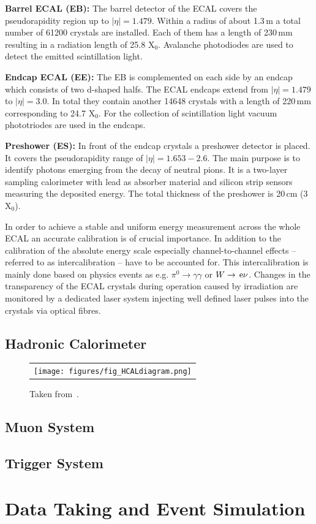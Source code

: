\begin{description}
 \item \textbf{Barrel ECAL (EB):} The barrel detector of the ECAL covers the pseudorapidity region up to $|\eta| = 1.479$. Within a radius of about 1.3\,m a total number of 61200 crystals are installed. Each of them has a length of 230\,mm resulting in a radiation length of 25.8 $\mathrm{X_0}$. Avalanche photodiodes are used to detect the emitted scintillation light.
 \item \textbf{Endcap ECAL (EE):} The EB is complemented on each side by an endcap which consists of two d-shaped halfs. The ECAL endcaps extend from $|\eta| = 1.479$ to $|\eta| = 3.0$. In total they contain another 14648 crystals with a length of 220\,mm corresponding to 24.7 $\mathrm{X}_0$. For the collection of scintillation light vacuum phototriodes are used in the endcaps.
 \item \textbf{Preshower (ES):} In front of the endcap crystals a preshower detector is placed. It covers the pseudorapidity range of $|\eta| = 1.653 - 2.6$. The main purpose is to identify photons emerging from the decay of neutral pions. It is a two-layer sampling calorimeter with lead as absorber material and silicon strip sensors measuring the deposited energy. The total thickness of the preshower is 20\,cm (3 $\mathrm{X_0}$).
\end{description}
In order to achieve a stable and uniform energy measurement across the whole ECAL an accurate calibration is of crucial importance. In addition to the calibration of the absolute energy scale especially channel-to-channel effects -- referred to as intercalibration -- have to be accounted for. This intercalibration is mainly done based on physics events as e.g. $\pi^0 \rightarrow \gamma \gamma$ or $W \rightarrow \,\text{e} \nu$. Changes in the transparency of the ECAL crystals during operation caused by irradiation are monitored by a dedicated laser system injecting well defined laser pulses into the crystals via optical fibres. 

\subsection{Hadronic Calorimeter}
\label{subsec:cms_hcal}

\begin{figure}[!tp]
  \centering
  \begin{tabular}{c}
    \texttt{[image: figures/fig\_HCALdiagram.png]}
  \end{tabular}
  \caption{Taken from~\cite{Chatrchyan:2009hw}.}
  \label{fig:CMS_hcal}
\end{figure}


\subsection{Muon System}
\label{subsec:cms_muon}

\subsection{Trigger System}
\label{subsec:cms_trigger}

\section{Data Taking and Event Simulation}
\label{sec:data}
